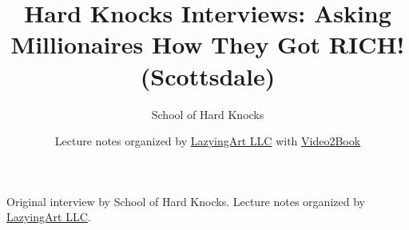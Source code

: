\documentclass[11pt,oneside]{book}
\begin{document}
\frontmatter
\title{Hard Knocks Interviews: Asking Millionaires How They Got RICH! (Scottsdale)}
\author{School of Hard Knocks}
\date{Lecture notes organized by \href{https://lazying.art}{LazyingArt LLC} with \href{https://github.com/lachlanchen/Video2Book}{Video2Book}}
\maketitle
\begin{center}
\small Original interview by School of Hard Knocks. Lecture notes organized by \href{https://lazying.art}{LazyingArt LLC}.
\end{center}
\clearpage
\mainmatter

\end{document}
